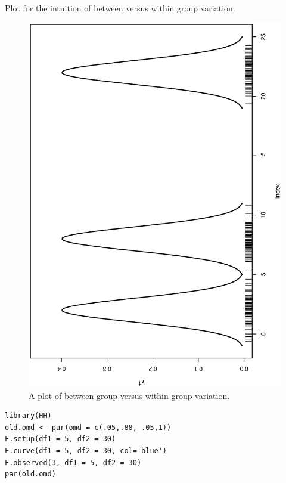 \documentclass[captions=tableheading]{scrbook}
\begin{document}
Plot for the intuition of between versus within group variation.







\begin{figure}[th]
  \includegraphics[angle=270, totalheight=4in]{ps/hypoth/Between-versus-within.ps}
  \caption[Between group versus within group variation]{A plot of between group versus within group variation.}
  \label{fig-Between-versus-within}
\end{figure}



\begin{verbatim}
library(HH)
old.omd <- par(omd = c(.05,.88, .05,1))
F.setup(df1 = 5, df2 = 30)
F.curve(df1 = 5, df2 = 30, col='blue')
F.observed(3, df1 = 5, df2 = 30)
par(old.omd)
\end{verbatim}
\end{document}
